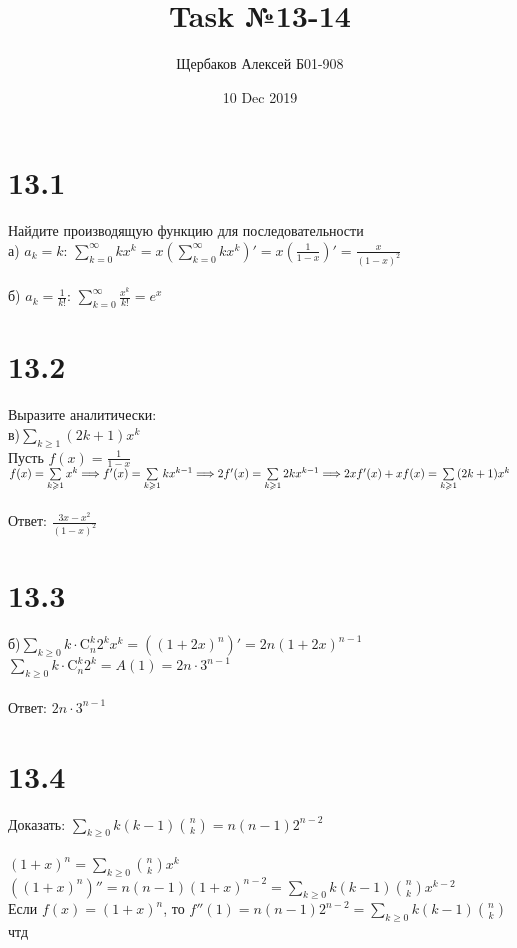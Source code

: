 \documentclass{article}
\title{Task №13-14}
\author{Щербаков Алексей Б01-908}
\date{10 Dec 2019}
\begin{document}
\maketitle
\section{13.1}
Найдите производящую функцию для последовательности\\
а) $a_k=k$: $\sum\limits_{k=0}^{\infty}kx^k=x(\sum\limits_{k=0}^{\infty}kx^k)'=x(\frac{1}{1-x})'=\frac{x}{(1-x)^2}$\\\\
б) $a_k=\frac{1}{k!}$: $\sum\limits_{k=0}^{\infty}\frac{x^k}{k!}=e^x$
\section{13.2}
Выразите аналитически:\\
в)$\sum\limits_{k\geqslant1}(2k+1)x^k$\\
Пусть $f(x)=\frac{1}{1-x}$\\
$f(x)=\sum\limits_{k\geqslant1}x^k \Longrightarrow f'(x)=\sum\limits_{k\geqslant1}kx^{k-1} \Longrightarrow 2f'(x)=\sum\limits_{k\geqslant1}2kx^{k-1} \Longrightarrow\\ 2xf'(x)+xf(x)=\sum\limits_{k\geqslant1}(2k+1)x^k$\\\\
Ответ: $\frac{3x-x^2}{(1-x)^2}$
\section{13.3}
б)$\sum\limits_{k\geqslant0}k\cdot\text{C}^k_n2^kx^k=((1+2x)^n)'=2n(1+2x)^{n-1}$\\
$\sum\limits_{k\geqslant0}k\cdot\text{C}^k_n2^k=A(1)=2n\cdot3^{n-1}$\\\\
Ответ: $2n\cdot3^{n-1}$
\section{13.4}
Доказать: $\sum\limits_{k\geqslant0}k(k-1){n\choose k}=n(n-1)2^{n-2}$\\\\
$(1+x)^{n}=\sum\limits_{k\geqslant0}{n\choose k}x^k$\\
$((1+x)^{n})''= n(n-1)(1+x)^{n-2}=\sum\limits_{k\geqslant0}k(k-1){n\choose k}x^{k-2}$\\
Если $f(x)=(1+x)^{n}$, то $f''(1)=n(n-1)2^{n-2}=\sum\limits_{k\geqslant0}k(k-1){n\choose k}$ чтд
\end{document}
